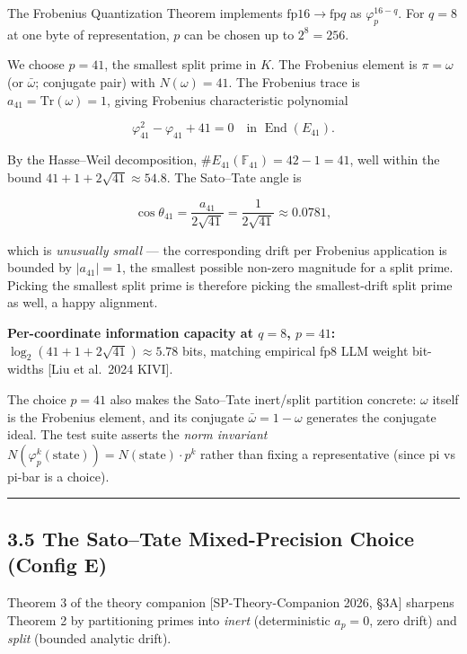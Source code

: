 \documentclass[
  11pt,
]{article}
\begin{document}
The Frobenius Quantization Theorem implements
\(\mathrm{fp}16 \to \mathrm{fp}q\) as \(\varphi_p^{16-q}\). For
\(q = 8\) at one byte of representation, \(p\) can be chosen up to
\(2^8 = 256\).

We choose \(p = 41\), the smallest split prime in \(K\). The Frobenius
element is \(\pi = \omega\) (or \(\bar{\omega}\); conjugate pair) with
\(N(\omega) = 41\). The Frobenius trace is
\(a_{41} = \mathrm{Tr}(\omega) = 1\), giving Frobenius characteristic
polynomial

\[\varphi_{41}^2 - \varphi_{41} + 41 = 0 \quad \text{in } \operatorname{End}(E_{41}).\]

By the Hasse--Weil decomposition,
\(\#E_{41}(\mathbb{F}_{41}) = 42 - 1 = 41\), well within the bound
\(41 + 1 + 2\sqrt{41} \approx 54.8\). The Sato--Tate angle is

\[\cos\theta_{41} = \frac{a_{41}}{2\sqrt{41}} = \frac{1}{2\sqrt{41}} \approx 0.0781,\]

which is \emph{unusually small} --- the corresponding drift per
Frobenius application is bounded by \(|a_{41}| = 1\), the smallest
possible non-zero magnitude for a split prime. Picking the smallest
split prime is therefore picking the smallest-drift split prime as well,
a happy alignment.

\textbf{Per-coordinate information capacity at \(q = 8\), \(p = 41\):}
\(\log_2(41 + 1 + 2\sqrt{41}) \approx 5.78\) bits, matching empirical
fp8 LLM weight bit-widths {[}Liu et al.~2024 KIVI{]}.

The choice \(p = 41\) also makes the Sato--Tate inert/split partition
concrete: \(\omega\) itself is the Frobenius element, and its conjugate
\(\bar{\omega} = 1 - \omega\) generates the conjugate ideal. The test
suite asserts the \emph{norm invariant}
\(N(\varphi_p^k(\text{state})) = N(\text{state}) \cdot p^k\) rather than
fixing a representative (since pi vs pi-bar is a choice).

\begin{center}\rule{0.5\linewidth}{0.5pt}\end{center}

\hypertarget{the-satotate-mixed-precision-choice-config-e}{%
\subsection{3.5 The Sato--Tate Mixed-Precision Choice (Config
E)}\label{the-satotate-mixed-precision-choice-config-e}}

Theorem 3 of the theory companion {[}SP-Theory-Companion 2026, §3A{]}
sharpens Theorem 2 by partitioning primes into \emph{inert}
(deterministic \(a_p = 0\), zero drift) and \emph{split} (bounded
analytic drift).
\end{document}
